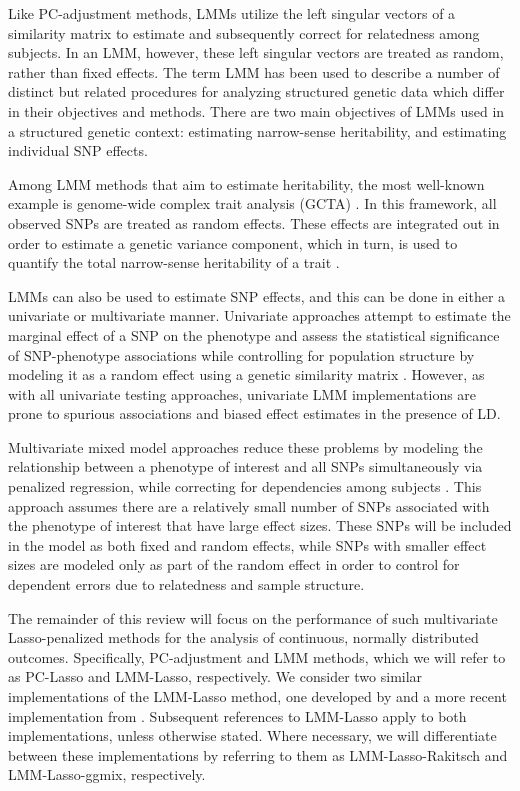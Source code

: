 Like PC-adjustment methods, LMMs utilize the left singular vectors of a similarity matrix to estimate and subsequently correct for relatedness among subjects. In an LMM, however, these left singular vectors are treated as random, rather than fixed effects. The term LMM has been used to describe a number of distinct but related procedures for analyzing structured genetic data which differ in their objectives and methods. There are two main objectives of LMMs used in a structured genetic context: estimating narrow-sense heritability, and estimating individual SNP effects.

Among LMM methods that aim to estimate heritability, the most well-known example is genome-wide complex trait analysis (GCTA) \citep{yang2011gcta}. In this framework, all observed SNPs are treated as random effects. These effects are integrated out in order to estimate a genetic variance component, which in turn, is used to quantify the total narrow-sense heritability of a trait \citep{yang2010common}.

LMMs can also be used to estimate SNP effects, and this can be done in either a univariate or multivariate manner. Univariate approaches attempt to estimate the marginal effect of a SNP on the phenotype and assess the statistical significance of SNP-phenotype associations while controlling for population structure by modeling it as a random effect using a genetic similarity matrix \citep{yu2006unified, kang2010variance, kang2008efficient}. However, as with all univariate testing approaches, univariate LMM implementations are prone to spurious associations and biased effect estimates in the presence of LD. 

Multivariate mixed model approaches reduce these problems by modeling the relationship between a phenotype of interest and all SNPs simultaneously via penalized regression, while correcting for dependencies among subjects \citep{Rakitsch2012, bhatnagar2019simultaneous}. This approach assumes there are a relatively small number of SNPs associated with the phenotype of interest that have large effect sizes. These SNPs will be included in the model as both fixed and random effects, while SNPs with smaller effect sizes are modeled only as part of the random effect in order to control for dependent errors due to relatedness and sample structure. 

The remainder of this review will focus on the performance of such multivariate Lasso-penalized methods for the analysis of continuous, normally distributed outcomes. Specifically, PC-adjustment and LMM methods, which we will refer to as PC-Lasso and LMM-Lasso, respectively. We consider two similar implementations of the LMM-Lasso method, one developed by \citet{Rakitsch2012} and a more recent implementation from \citet{bhatnagar2019simultaneous}. Subsequent references to LMM-Lasso apply to both implementations, unless otherwise stated. Where necessary, we will differentiate between these implementations by referring to them as LMM-Lasso-Rakitsch and LMM-Lasso-ggmix, respectively. 

